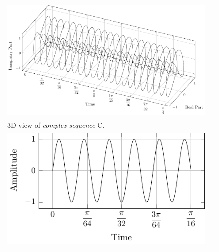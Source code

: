 \documentclass[../../course]{subfiles}
\begin{document}
\begin{figure} [H]

    \renewcommand{\arraystretch}{0.75}
    \centering
    \begin{NiceTabularX} {\textwidth} {
            *{2}{>{\centering\arraybackslash}X}
        }

         {
             {
                \includegraphics[height = \textheight] {tikzpics/plotComplexC.pdf}
            }
        }

        &
        \\

         {
            \vbox{
                 {3D view of \emph{complex sequence} C.}
                \label{plt:cmplxC}
            }
        }

        &
        \\

         {
             {
                \includegraphics[height = \textheight] {tikzpics/plotShortX1.pdf}
            }
        }

        &


\end{NiceTabularX}
\end{figure}
\end{document}
